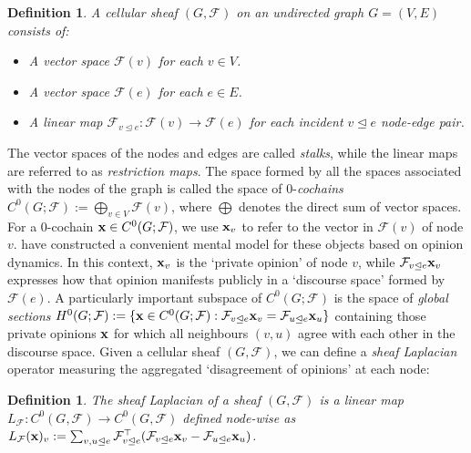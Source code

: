 \documentclass{article}
\newtheorem{definition}[theorem]{Definition}
\def\vx{{\bf{x}}}
\def\gF{{\mathcal{F}}}
\newcommand{\tleq}{\trianglelefteq}
\begin{document}
\begin{definition}
A cellular sheaf $(G, \gF)$ on an undirected graph $G = (V, E)$ consists of:
\begin{itemize}[leftmargin=10mm, topsep=0pt,itemsep=-0.4ex]
    \item A vector space $\gF(v)$ for each $v \in V$.
    \item A vector space $\gF(e)$ for each $e \in E$.
    \item A linear map $\gF_{v \trianglelefteq e}: \gF(v) \to \gF(e)$ for each incident $v \trianglelefteq e$ node-edge pair.
\end{itemize}
\end{definition}
\vspace{-5pt}
The vector spaces of the nodes and edges are called \emph{stalks}, while the linear maps are referred to as \emph{restriction maps}. The space formed by all the spaces associated with the nodes of the graph is called the space of 0-{\em cochains} $C^0(G;\gF) :=\bigoplus_{v \in V}\gF(v)$, where $\bigoplus$ denotes the direct sum of vector spaces.
For a 0-cochain $\vx \in C^0(G;\gF)$, we use $\vx_v$ to refer to the vector in $\gF(v)$ of node $v$. \citet{hansen2021opinion} have constructed a convenient mental model for these objects based on opinion dynamics. In this context, $\vx_v$ is the `private opinion' of node $v$, while $\gF_{v \tleq e}\vx_v$ expresses how that opinion manifests publicly in a `discourse space' formed by $\gF(e)$. A particularly important subspace of $C^0(G;\gF)$ is the space of \emph{global sections} $H^0(G; \gF) := \{ \vx \in C^0(G; \gF) : \gF_{v \tleq e} \vx_v = \gF_{u \tleq e}\vx_u\}$ containing those private opinions $\vx$ for which all neighbours $(v, u)$ agree with each other in the discourse space. 
Given a cellular sheaf $(G, \gF)$, we can define a {\em sheaf Laplacian} operator \citep{hansen2019toward} measuring the aggregated `disagreement of opinions' at each node:
\begin{definition}\label{def:laplacian}
The sheaf Laplacian of a sheaf $(G, \gF)$ is a linear map $L_{\gF}: C^0(G, \gF) \to C^0(G, \gF)$ defined node-wise as $L_\gF(\vx)_v := \sum_{v, u \tleq e}\gF_{v \tleq e}^\top(\gF_{v \tleq e} \vx_v - \gF_{u \tleq e}\vx_u)$. 
\end{definition}
\vspace{-5pt}
\end{document}
